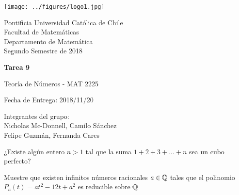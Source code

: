 


\begin{minipage}{2.5cm}
	\texttt{[image: ../figures/logo1.jpg]}
\end{minipage}
\begin{minipage}{13cm}
	\begin{flushleft}
		\raggedright
		{
			\noindent
			{\sc Pontificia Universidad Católica de Chile\\
				Facultad de Matemáticas\\
				Departamento de Matemática} \smallskip \\
			Segundo Semestre de 2018\\
		}
	\end{flushleft}
\end{minipage}

\vspace{2ex}
{\Large \centerline{\bf Tarea 9}}
{\large \centerline{Teoría de Números - MAT 2225}}
\centerline{Fecha de Entrega: 2018/11/20}

\begin{flushright}
	Integrantes del grupo:\\
	Nicholas Mc-Donnell, Camilo Sánchez\\
	Felipe Guzmán, Fernanda Cares
\end{flushright}

\begin{prob}[10 pts.]
	¿Existe algún entero $n>1$ tal que la suma $1+2+3+...+n$ sea un cubo perfecto?
\end{prob}

\begin{sol}

\end{sol}

\begin{prob}[10 pts.]
	Muestre que existen infinitos números racionales $a\in\mathbb{Q}$ tales que el polinomio $P_a(t)=at^2-12t+a^2$ es reducible sobre $\mathbb{Q}$
\end{prob}

